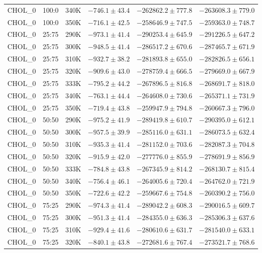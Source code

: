 \begin{longtable}{|c|c|c|c|c|c|}
CHOL\_0 & 100:0 & 340K & $-746.1 \pm 43.4$ & $-262862.2 \pm 777.8$ & $-263608.3 \pm 779.0$ \\
CHOL\_0 & 100:0 & 350K & $-716.1 \pm 42.5$ & $-258646.9 \pm 747.5$ & $-259363.0 \pm 748.7$ \\
CHOL\_0 & 25:75 & 290K & $-973.1 \pm 41.4$ & $-290253.4 \pm 645.9$ & $-291226.5 \pm 647.2$ \\
CHOL\_0 & 25:75 & 300K & $-948.5 \pm 41.4$ & $-286517.2 \pm 670.6$ & $-287465.7 \pm 671.9$ \\
CHOL\_0 & 25:75 & 310K & $-932.7 \pm 38.2$ & $-281893.8 \pm 655.0$ & $-282826.5 \pm 656.1$ \\
CHOL\_0 & 25:75 & 320K & $-909.6 \pm 43.0$ & $-278759.4 \pm 666.5$ & $-279669.0 \pm 667.9$ \\
CHOL\_0 & 25:75 & 333K & $-795.2 \pm 44.2$ & $-267896.5 \pm 816.8$ & $-268691.7 \pm 818.0$ \\
CHOL\_0 & 25:75 & 340K & $-763.1 \pm 44.4$ & $-264608.0 \pm 730.6$ & $-265371.1 \pm 731.9$ \\
CHOL\_0 & 25:75 & 350K & $-719.4 \pm 43.8$ & $-259947.9 \pm 794.8$ & $-260667.3 \pm 796.0$ \\
CHOL\_0 & 50:50 & 290K & $-975.2 \pm 41.9$ & $-289419.8 \pm 610.7$ & $-290395.0 \pm 612.1$ \\
CHOL\_0 & 50:50 & 300K & $-957.5 \pm 39.9$ & $-285116.0 \pm 631.1$ & $-286073.5 \pm 632.4$ \\
CHOL\_0 & 50:50 & 310K & $-935.3 \pm 41.4$ & $-281152.0 \pm 703.6$ & $-282087.3 \pm 704.8$ \\
CHOL\_0 & 50:50 & 320K & $-915.9 \pm 42.0$ & $-277776.0 \pm 855.9$ & $-278691.9 \pm 856.9$ \\
CHOL\_0 & 50:50 & 333K & $-784.8 \pm 43.8$ & $-267345.9 \pm 814.2$ & $-268130.7 \pm 815.4$ \\
CHOL\_0 & 50:50 & 340K & $-756.4 \pm 46.1$ & $-264005.6 \pm 720.4$ & $-264762.0 \pm 721.9$ \\
CHOL\_0 & 50:50 & 350K & $-722.6 \pm 42.2$ & $-259667.6 \pm 754.8$ & $-260390.2 \pm 756.0$ \\
CHOL\_0 & 75:25 & 290K & $-974.3 \pm 41.4$ & $-289042.2 \pm 608.3$ & $-290016.5 \pm 609.7$ \\
CHOL\_0 & 75:25 & 300K & $-951.3 \pm 41.4$ & $-284355.0 \pm 636.3$ & $-285306.3 \pm 637.6$ \\
CHOL\_0 & 75:25 & 310K & $-929.4 \pm 41.6$ & $-280610.6 \pm 631.7$ & $-281540.0 \pm 633.1$ \\
CHOL\_0 & 75:25 & 320K & $-840.1 \pm 43.8$ & $-272681.6 \pm 767.4$ & $-273521.7 \pm 768.6$ \\

\end{longtable}
